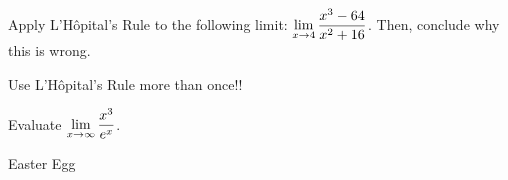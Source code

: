 \documentclass{ximera}
\begin{document}
     \begin{problem}
     Apply L'H\^{o}pital's Rule to the following limit: $\displaystyle \lim_{x \to 4} \displaystyle\frac{x^3 - 64}{x^2+16}$. Then, conclude why this is wrong.
\end{problem}

\begin{problem}
\begin{hint}
Use L'H\^{o}pital's Rule more than once!!
\end{hint}
Evaluate $\displaystyle \lim_{x \to \infty} \displaystyle\frac{x^3}{e^x}$.
\end{problem}


\begin{example}
	Easter Egg
\end{example}
\end{document}
